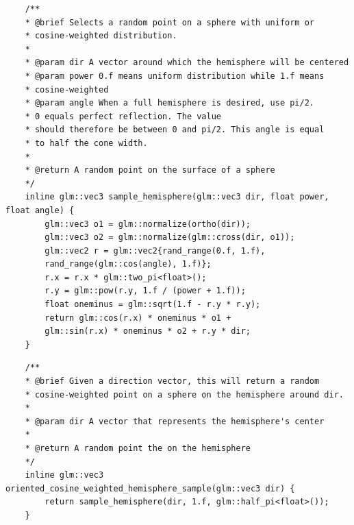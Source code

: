 \documentclass[
  twoside,
  11pt, a4paper,
  footinclude=true,
  headinclude=true,
  cleardoublepage=empty
]{scrreprt}
\begin{document}
\begin{verbatim}
    /**
    * @brief Selects a random point on a sphere with uniform or
    * cosine-weighted distribution.
    *
    * @param dir A vector around which the hemisphere will be centered
    * @param power 0.f means uniform distribution while 1.f means
    * cosine-weighted
    * @param angle When a full hemisphere is desired, use pi/2.
    * 0 equals perfect reflection. The value
    * should therefore be between 0 and pi/2. This angle is equal
    * to half the cone width.
    *
    * @return A random point on the surface of a sphere
    */
    inline glm::vec3 sample_hemisphere(glm::vec3 dir, float power, float angle) {
        glm::vec3 o1 = glm::normalize(ortho(dir));
        glm::vec3 o2 = glm::normalize(glm::cross(dir, o1));
        glm::vec2 r = glm::vec2{rand_range(0.f, 1.f),
        rand_range(glm::cos(angle), 1.f)};
        r.x = r.x * glm::two_pi<float>();
        r.y = glm::pow(r.y, 1.f / (power + 1.f));
        float oneminus = glm::sqrt(1.f - r.y * r.y);
        return glm::cos(r.x) * oneminus * o1 +
        glm::sin(r.x) * oneminus * o2 + r.y * dir;
    }
\end{verbatim}

\begin{verbatim}
    /**
    * @brief Given a direction vector, this will return a random
    * cosine-weighted point on a sphere on the hemisphere around dir.
    *
    * @param dir A vector that represents the hemisphere's center
    *
    * @return A random point the on the hemisphere
    */
    inline glm::vec3 oriented_cosine_weighted_hemisphere_sample(glm::vec3 dir) {
        return sample_hemisphere(dir, 1.f, glm::half_pi<float>());
    }
\end{verbatim}
\end{document}
